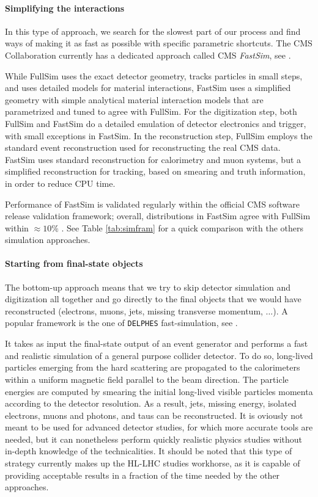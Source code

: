 \paragraph{Simplifying the interactions}

In this type of approach, we search for the slowest part of our process and find ways of making it as fast as possible with specific parametric shortcuts. The CMS Collaboration currently has a dedicated approach called CMS \emph{FastSim}, see \cite{https://doi.org/10.48550/arxiv.1701.03850}. 

While FullSim uses the exact detector geometry, tracks particles in small steps, and uses
detailed models for material interactions, FastSim uses a simplified geometry with simple analytical material interaction models that are parametrized
and tuned to agree with FullSim. For the digitization step, both FullSim and FastSim do a detailed
emulation of detector electronics and trigger, with small exceptions in FastSim. In the reconstruction step, FullSim employs the standard event reconstruction used for reconstructing the real CMS
data. FastSim uses standard reconstruction for calorimetry and muon systems, but a simplified
reconstruction for tracking, based on smearing and truth information, in order to reduce CPU time.

Performance of FastSim is validated regularly within the official CMS software release validation framework; overall, distributions in FastSim agree with FullSim within $\approx 10\%$ \cite{https://doi.org/10.48550/arxiv.1701.03850}. See Table \ref{tab:simfram} for a quick comparison with the others simulation approaches.

\paragraph{Starting from final-state objects}

The bottom-up approach means that we try to skip detector simulation and digitization all together and go directly to the final objects that we would have reconstructed (electrons, muons, jets, missing transverse momentum, $\dots$). A popular framework is the one of \texttt{DELPHES} fast-simulation, see \cite{de_Favereau_2014}.

It takes as input the final-state output of an event generator and performs a fast and realistic simulation of
a general purpose collider detector. To do so, long-lived particles emerging from the hard
scattering are propagated to the calorimeters within a uniform magnetic field parallel to
the beam direction. The particle energies are computed by smearing the initial long-lived
visible particles momenta according to the detector resolution. As a result, jets, missing
energy, isolated electrons, muons and photons, and taus can be reconstructed. It is oviously not meant to
be used for advanced detector studies, for which more accurate tools are needed, but it can nonetheless perform quickly realistic physics studies without in-depth knowledge of the technicalities. It should be noted that this type of strategy currently makes up the HL-LHC studies workhorse, as it is capable of providing acceptable results in a fraction of the time needed by the other approaches.


